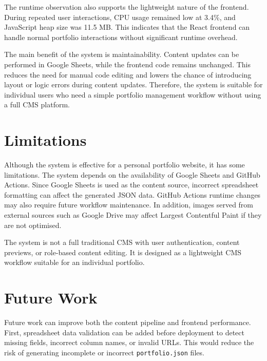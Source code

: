 \documentclass[10pt,a4paper,twocolumn]{article}
\begin{document}
The runtime observation also supports the lightweight nature of the frontend. During repeated user interactions, CPU usage remained low at 3.4\%, and JavaScript heap size was 11.5 MB. This indicates that the React frontend can handle normal portfolio interactions without significant runtime overhead.

The main benefit of the system is maintainability. Content updates can be performed in Google Sheets, while the frontend code remains unchanged. This reduces the need for manual code editing and lowers the chance of introducing layout or logic errors during content updates. Therefore, the system is suitable for individual users who need a simple portfolio management workflow without using a full CMS platform.

\section{Limitations}

Although the system is effective for a personal portfolio website, it has some limitations. The system depends on the availability of Google Sheets and GitHub Actions. Since Google Sheets is used as the content source, incorrect spreadsheet formatting can affect the generated JSON data. GitHub Actions runtime changes may also require future workflow maintenance. In addition, images served from external sources such as Google Drive may affect Largest Contentful Paint if they are not optimised.

The system is not a full traditional CMS with user authentication, content previews, or role-based content editing. It is designed as a lightweight CMS workflow suitable for an individual portfolio.

\section{Future Work}

Future work can improve both the content pipeline and frontend performance. First, spreadsheet data validation can be added before deployment to detect missing fields, incorrect column names, or invalid URLs. This would reduce the risk of generating incomplete or incorrect \texttt{portfolio.json} files.
\end{document}
